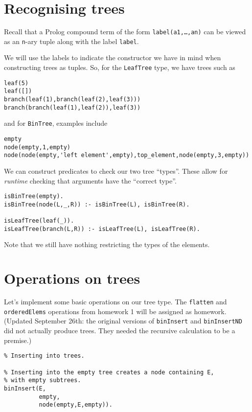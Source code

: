 \documentclass[11pt]{article}
\begin{document}
\section{Recognising trees}
\label{sec:orgf4e01fd}
Recall that
a Prolog compound term of the form \texttt{label(a1,…,an)} can be viewed
as an \texttt{n}-ary tuple along with the label \texttt{label}.

We will use the labels to indicate the constructor we have in mind
when constructing trees as tuples.
So, for the \texttt{LeafTree} type, we have trees such as
\begin{verbatim}
leaf(5)
leaf([])
branch(leaf(1),branch(leaf(2),leaf(3)))
branch(branch(leaf(1),leaf(2)),leaf(3))
\end{verbatim}
and for \texttt{BinTree}, examples include
\begin{verbatim}
empty
node(empty,1,empty)
node(node(empty,'left element',empty),top_element,node(empty,3,empty))
\end{verbatim}

We can construct predicates to check our two tree “types”.
These allow for \emph{runtime} checking that arguments have the “correct type”. 
\begin{verbatim}
isBinTree(empty).
isBinTree(node(L,_,R)) :- isBinTree(L), isBinTree(R).

isLeafTree(leaf(_)).
isLeafTree(branch(L,R)) :- isLeafTree(L), isLeafTree(R).
\end{verbatim}
Note that we still have nothing restricting the types of the elements.

\section{Operations on trees}
\label{sec:orgc22a853}
Let's implement some basic operations on our tree type.
The \texttt{flatten} and \texttt{orderedElems} operations
from homework 1 will be assigned as homework.
(Updated September 26th: the original versions
of \texttt{binInsert} and \texttt{binInsertND} did not actually produce trees.
They needed the recursive calculation to be a premise.)
\begin{verbatim}
% Inserting into trees.

% Inserting into the empty tree creates a node containing E,
% with empty subtrees.
binInsert(E,
          empty,
          node(empty,E,empty)).
\end{verbatim}
\end{document}
